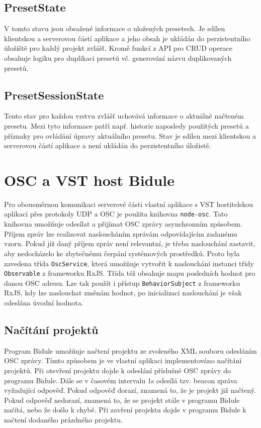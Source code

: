 \documentclass[thesis=M,czech]{FITthesis}[2019/03/06]
\begin{document}
		\subsection{PresetState}
			V tomto stavu jsou obsažené informace o uložených presetech. Je sdílen klientskou a serverovou částí aplikace a jeho obsah je ukládán do perzistentního úložiště pro každý projekt zvlášť.
			Kromě funkcí z API pro CRUD operace obsahuje logiku pro duplikaci presetů vč. generování
			názvu duplikovaných presetů.
			
		\subsection{PresetSessionState}
			Tento stav pro každou vrstvu zvlášť uchovává informace o aktuálně načteném presetu.
			Mezi tyto informace patří např. historie naposledy použitých presetů a příznaky pro 
			ovládání úpravy aktuálního presetu. Stav je sdílen mezi klientskou a serverovou částí
			aplikace a není ukládán do perzistentního úložistě.
		
	\section{OSC a VST host Bidule}
		
		Pro obousměrnou komunikaci serverové části vlastní aplikace s VST hostitelskou aplikací přes protokoly UDP a OSC je použita knihovna \texttt{node-osc}.
		Tato knihovna umožňuje odesílat a přijímat OSC zprávy asynchronním způsobem. Příjem zpráv lze realizovat 
		nasloucháním zprávám odpovídajícím zadanému vzoru. Pokud již daný příjem zpráv není relevantní, je třeba naslouchání zastavit,
		aby nedocházelo ke zbytečnému čerpání systémových prostředků. Proto byla zavedena třída \texttt{OscService}, která 
		umožňuje vytvořit k naslouchání instanci třídy \texttt{Observable} z frameworku RxJS. Třída též obsahuje 
		mapu posledních hodnot pro danou OSC adresu. Lze tak použít i přístup \texttt{BehaviorSubject} z frameworku RxJS,
		kdy lze naslouchat změnám hodnot, po inicializaci naslouchání je však odeslána úvodní hodnota.
		
		\subsection{Načítání projektů}
		Program Bidule umožňuje načtení projektu ze zvoleného XML souboru odesláním OSC zprávy. Tímto způsobem
		je ve vlastní aplikaci implementováno načítání projektů. Při otevření projektu dojde k odeslání příslušné
		OSC zprávy do programu Bidule. Dále se v časovém intervalu 1s odesílá tzv. beacon zpráva vyžadující odpověď.
		Pokud odpověď dorazí, znamená to, že je projekt již načtený. Pokud odpověď nedorazí, znamená to, že se projekt stále v programu Bidule načítá,
		nebo že došlo k chybě. Při zavření projektu dojde v programu Bidule k načtení dodaného prázdného projektu.
	
\end{document}
